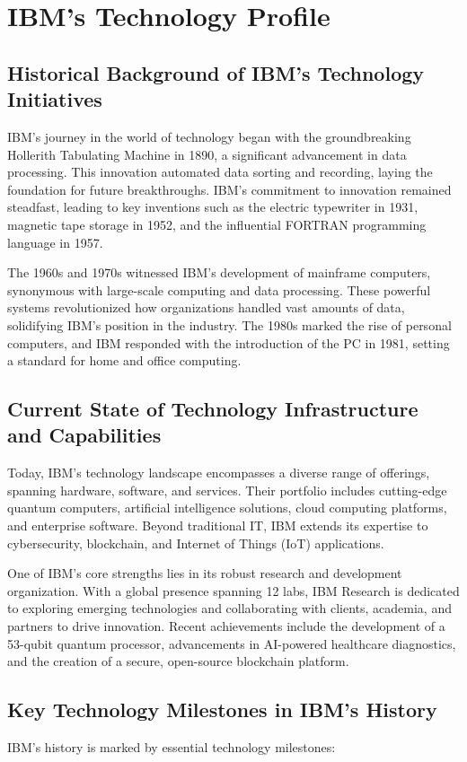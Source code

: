 \section{IBM's Technology Profile}

\subsection{Historical Background of IBM's Technology Initiatives}
IBM's journey in the world of technology began with the groundbreaking Hollerith Tabulating Machine in 1890, a significant advancement in data processing. This innovation automated data sorting and recording, laying the foundation for future breakthroughs. IBM's commitment to innovation remained steadfast, leading to key inventions such as the electric typewriter in 1931, magnetic tape storage in 1952, and the influential FORTRAN programming language in 1957.

The 1960s and 1970s witnessed IBM's development of mainframe computers, synonymous with large-scale computing and data processing. These powerful systems revolutionized how organizations handled vast amounts of data, solidifying IBM's position in the industry. The 1980s marked the rise of personal computers, and IBM responded with the introduction of the PC in 1981, setting a standard for home and office computing.

\subsection{Current State of Technology Infrastructure and Capabilities}
Today, IBM's technology landscape encompasses a diverse range of offerings, spanning hardware, software, and services. Their portfolio includes cutting-edge quantum computers, artificial intelligence solutions, cloud computing platforms, and enterprise software. Beyond traditional IT, IBM extends its expertise to cybersecurity, blockchain, and Internet of Things (IoT) applications.

One of IBM's core strengths lies in its robust research and development organization. With a global presence spanning 12 labs, IBM Research is dedicated to exploring emerging technologies and collaborating with clients, academia, and partners to drive innovation. Recent achievements include the development of a 53-qubit quantum processor, advancements in AI-powered healthcare diagnostics, and the creation of a secure, open-source blockchain platform.

\subsection{Key Technology Milestones in IBM's History}
IBM's history is marked by essential technology milestones:


